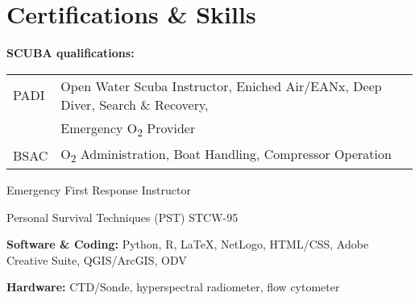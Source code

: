 \documentclass[a4paper]{deedy-resume} %
\begin{document}

\section{Certifications \& Skills}
\sectionspace

\begin{tightitemize}
\item \textbf{SCUBA qualifications:}  \\
\begin{tabular}{ l l }
PADI & Open Water Scuba Instructor, Eniched Air/EANx, Deep Diver, Search \& Recovery,  \\
 & Emergency O\textsubscript{2} Provider \\
BSAC & O\textsubscript{2} Administration, Boat Handling, Compressor Operation
\end{tabular}
\item Emergency First Response Instructor
\item Personal Survival Techniques (PST) STCW-95
\item \textbf{Software \& Coding:} Python, R, \LaTeX, NetLogo, HTML/CSS, Adobe Creative Suite, QGIS/ArcGIS, ODV
\item \textbf{Hardware:} CTD/Sonde, hyperspectral radiometer, flow cytometer
\end{tightitemize}

\sectionspace %


\end{document}
